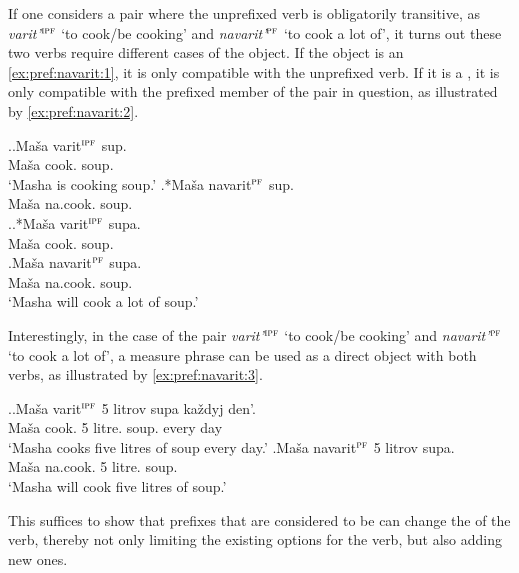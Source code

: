 If one considers a pair where the unprefixed verb is obligatorily transitive, as \textit{varit'}$^{\textsc{ipf}}$ `to cook/be cooking' and \textit{navarit'}$^{\textsc{pf}}$ `to cook a lot of', it turns out these two verbs require different cases of the object. If the object is an  \ref{ex:pref:navarit:1}, it is only compatible with the unprefixed verb. If it is a , it is only compatible with the prefixed member of the pair in question, as illustrated by \ref{ex:pref:navarit:2}.

\ex.\label{ex:pref:navarit:1}\ag.\label{ex:varit:1}Ma\v{s}a varit$^{\textsc{ipf}}$ sup.\\
Ma\v{s}a cook. soup.\\
\trans `Masha is cooking soup.'
\bg.*Ma\v{s}a navarit$^{\textsc{pf}}$ sup.\label{ex:navarit1}\\
Ma\v{s}a na.cook. soup.\\

\ex.\label{ex:pref:navarit:2}\ag.*Ma\v{s}a varit$^{\textsc{ipf}}$ supa.\label{ex:varit2}\\
Ma\v{s}a cook. soup.\\
\bg.\label{ex:navarit2}Ma\v{s}a navarit$^{\textsc{pf}}$ supa.\\
Ma\v{s}a na.cook. soup.\\
\trans `Masha will cook a lot of soup.'

Interestingly, in the case of the pair \textit{varit'}$^{\textsc{ipf}}$ `to cook/be cooking' and \textit{navarit'}$^{\textsc{pf}}$ `to cook a lot of', a measure phrase can be used as a direct object with both verbs, as illustrated by \ref{ex:pref:navarit:3}.

\ex.\label{ex:pref:navarit:3}\ag.\label{ex:varit3}Ma\v{s}a varit$^{\textsc{ipf}}$ 5 litrov supa ka\v{z}dyj den'.\\
Ma\v{s}a cook. 5 litre. soup. every day\\
\trans `Masha cooks five litres of soup every day.'
\bg.\label{ex:navarit3}Ma\v{s}a navarit$^{\textsc{pf}}$ 5 litrov supa.\\
Ma\v{s}a na.cook. 5 litre. soup.\\
\trans `Masha will cook five litres of soup.'

This suffices to show that prefixes that are considered to be  can change the  of the verb, thereby not only limiting the existing options for the  verb, but also adding new ones.

